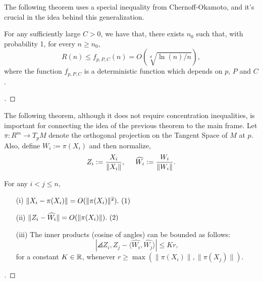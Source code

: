The following theorem uses a special inequality from Chernoff-Okamoto, and it's crucial in the idea behind this generalization.

\begin{theorem}\label{ade:T2}
  For any sufficiently large $C > 0$, we have that, there exists $n_0$ such that, with probability 1, for every $n \geq n_0$,
  \begin{equation}\label{ade:3}
    R(n) \leq f_{p,P,C}(n) = O(\sqrt[d]{\ln(n)/n}),
  \end{equation}
  where the function $f_{p,P,C}$ is a deterministic function which depends on $p,\, P$ and $C$.
\end{theorem}

\begin{proof}[]

\end{proof}

\vspace*{0.5 em}

The following theorem, although it does not require concentration inequalities, is important for connecting the idea of the previous theorem to the main frame. Let $\pi : R^m \to T_p M$ denote the orthogonal projection on the Tangent Space of $M$ at $p$. Also, define $W_i := \pi(X_i)$ and then normalize,
\begin{equation}\label{ade:4}
  Z_i := \frac{X_i}{\|X_i\|},\hspace*{5mm} \widehat{W_i} := \frac{W_i}{\|W_i\|}.
\end{equation}

\begin{theorem}\label{ade:T3}
  For any $i<j \leq n$,
  \begin{enumerate}
    \item[(i)]    \( \|X_i-\pi(X_i)\|  =   O(\|\pi (X_i)\|^2). \hfill\inlinetag  \)
    \item[(ii)]   \( \|Z_i-\widehat{W_i}\|  =   O(\|\pi (X_i) \|). \hfill\inlinetag \)
    \item[(iii)]  The inner products (cosine of angles) can be bounded as follows:
    \begin{equation}\label{ade:7}
      |\angles{Z_i,Z_j} - \langle\widehat{W_i}, \widehat{W_j}\rangle| \leq K r,
    \end{equation}
    for a constant $K\in\mathbb{R}$, whenever $r \geq \max (\|\pi(X_i)\|,\|\pi(X_j)\|)$.
  \end{enumerate}
\end{theorem}
\begin{proof}[]

\end{proof}

